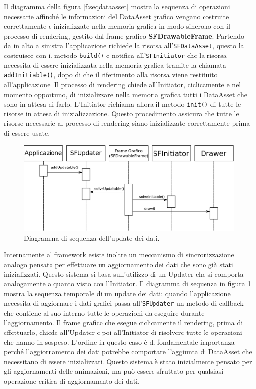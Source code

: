 Il diagramma della figura \ref{f:seqdataasset} mostra la sequenza di operazioni necessarie affinch\'e le informazioni del DataAsset grafico vengano costruite correttamente e inizializzate nella memoria grafica in modo sincrono con il processo di rendering, gestito dal frame grafico \textbf{SFDrawableFrame}.
Partendo da in alto a sinistra l'applicazione richiede la risorsa all'\texttt{SFDataAsset}, questo la costruisce con il metodo \texttt{build()} e notifica all'\texttt{SFInitiator} che la risorsa necessita di essere inizializzata nella memoria grafica tramite la chiamata \texttt{addInitiable()}, dopo di che il riferimento alla risorsa viene restituito all'applicazione.
Il processo di rendering chiede all'Initiator, ciclicamente e nel momento opportuno, di inizializzare nella memoria grafica tutti i DataAsset che sono in attesa di farlo. L'Initiator richiama allora il metodo \texttt{init()} di tutte le risorse in attesa di inizializzazione.
Questo procedimento assicura che tutte le risorse necessarie al processo di rendering siano inizializzate correttamente prima di essere usate.

\begin{figure}
\begin{center}
\includegraphics[width=\textwidth]{Immagini/sequenzaUpdatable}
\caption{Diagramma di sequenza dell'update dei dati.\label{f:sequpdate}} 
\end{center} 
\end{figure}

Internamente al framework esiste inoltre un meccanismo di sincronizzazione analogo pensato per effettuare un aggiornamento dei dati che sono gi\`a stati inizializzati. Questo sistema si basa sull'utilizzo di un Updater che si comporta analogamente a quanto visto con l'Initiator. Il diagramma di sequenza in figura \ref{f:sequpdate} mostra la sequenza temporale di un update dei dati: quando l'applicazione necessita di aggiornare i dati grafici passa all'\texttt{SFUpdater} un metodo di callback che contiene al suo interno tutte le operazioni da eseguire durante l'aggiornamento.
Il frame grafico che esegue ciclicamente il rendering, prima di effettuarlo, chiede all'Updater e poi all'Initiator di risolvere tutte le operazioni che hanno in sospeso. L'ordine in questo caso \`e di fondamentale importanza perch\'e l'aggiornamento dei dati potrebbe comportare l'aggiunta di DataAsset che necessitano di essere inizializzati. Questo sistema \`e stato inizialmente pensato per gli aggiornamenti delle animazioni, ma pu\`o essere sfruttato per qualsiasi operazione critica di aggiornamento dei dati.


